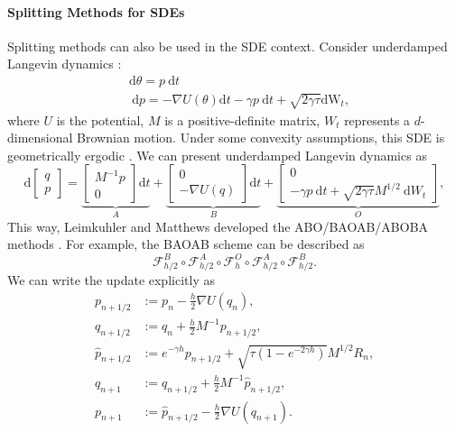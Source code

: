 \documentclass[11pt, twoside]{report}
\begin{document}
\paragraph{Splitting Methods for SDEs}
Splitting methods can also be used in the SDE context. Consider underdamped Langevin dynamics \cite{leimkuhler2015molecular}:
$$
\begin{aligned}
& \mathrm{d} \theta=p \mathrm{~d} t \\
& \mathrm{~d} p=-\nabla U(\theta) \mathrm{d} t-\gamma p \mathrm{~d} t+\sqrt{2 \gamma \tau} \mathrm{dW}_t,
\end{aligned}
$$
where $U$ is the potential, $M$ is a positive-definite matrix, $W_t$ represents a $d$-dimensional Brownian motion.
Under some convexity assumptions, this SDE is geometrically ergodic \cite{leimkuhler2024abo}.
We can present underdamped Langevin dynamics  as
\begin{equation}
\mathrm{d}\left[\begin{array}{l}
q \\
p
\end{array}\right]=\underbrace{\left[\begin{array}{c}
M^{-1} p \\
0
\end{array}\right] \mathrm{d} t}_A+\underbrace{\left[\begin{array}{c}
0 \\
-\nabla U(q)
\end{array}\right] \mathrm{d} t}_B+\underbrace{\left[\begin{array}{c}
0 \\
-\gamma p \mathrm{~d} t+\sqrt{2 \gamma \tau} M^{1 / 2} \mathrm{~d} W_t
\end{array}\right]}_O,
\end{equation}
This way, Leimkuhler and Matthews developed the ABO/BAOAB/ABOBA methods \cite{leimkuhler2024abo,leimkuhler2013rational}. For example, the BAOAB scheme can be described as
\begin{equation} \label{eq:baoab_flow}
\mathcal{F}_{h / 2}^B \circ \mathcal{F}_{h / 2}^A \circ \mathcal{F}_h^O \circ \mathcal{F}_{h / 2}^A \circ \mathcal{F}_{h / 2}^B.
\end{equation}
We can write the update explicitly as
$$
\begin{aligned}
p_{n+1 / 2} & :=p_n-\frac{h}{2} \nabla U\left(q_n\right), \\
q_{n+1 / 2} & :=q_n+\frac{h}{2} M^{-1} p_{n+1 / 2}, \\
\hat{p}_{n+1 / 2} & :=e^{-\gamma h} p_{n+1 / 2}+\sqrt{\tau\left(1-e^{-2\gamma h}\right)} M^{1 / 2} R_n, \\
q_{n+1} & :=q_{n+1 / 2}+\frac{h}{2} M^{-1} \hat{p}_{n+1 / 2}, \\
p_{n+1} & :=\hat{p}_{n+1 / 2}-\frac{h}{2} \nabla U\left(q_{n+1}\right) .
\end{aligned}
$$
\end{document}
